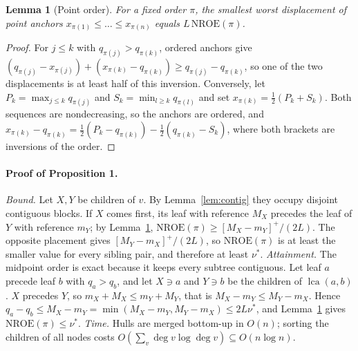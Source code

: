 \documentclass[preprint]{vgtc}
\newtheorem{lemma}{Lemma}
\newcommand{\lca}{\operatorname{lca}}
\newcommand{\nroe}{\mathrm{NROE}}
\begin{document}
\begin{lemma}[Point order]\label{lem:nroe}
For a fixed order $\pi$, the smallest worst displacement of point anchors $x_{\pi(1)}\le\dots\le x_{\pi(n)}$ equals $L\,\nroe(\pi)$.
\end{lemma}
\begin{proof}
For $j\le k$ with $q_{\pi(j)}>q_{\pi(k)}$, ordered anchors give $(q_{\pi(j)}-x_{\pi(j)})+(x_{\pi(k)}-q_{\pi(k)})\ge q_{\pi(j)}-q_{\pi(k)}$, so one of the two displacements is at least half of this inversion. Conversely, let $P_k=\max_{j\le k}q_{\pi(j)}$ and $S_k=\min_{l\ge k}q_{\pi(l)}$ and set $x_{\pi(k)}=\tfrac12(P_k+S_k)$. Both sequences are nondecreasing, so the anchors are ordered, and $x_{\pi(k)}-q_{\pi(k)}=\tfrac12(P_k-q_{\pi(k)})-\tfrac12(q_{\pi(k)}-S_k)$, where both brackets are inversions of the order.
\end{proof}

\paragraph{Proof of Proposition 1.} \emph{Bound.} Let $X,Y$ be children of $v$. By Lemma~\ref{lem:contig} they occupy disjoint contiguous blocks. If $X$ comes first, its leaf with reference $M_X$ precedes the leaf of $Y$ with reference $m_Y$; by Lemma~\ref{lem:nroe}, $\nroe(\pi)\ge[M_X-m_Y]^+/(2L)$. The opposite placement gives $[M_Y-m_X]^+/(2L)$, so $\nroe(\pi)$ is at least the smaller value for every sibling pair, and therefore at least $\nu^*$.
\emph{Attainment.} The midpoint order is exact because it keeps every subtree contiguous. Let leaf $a$ precede leaf $b$ with $q_a>q_b$, and let $X\ni a$ and $Y\ni b$ be the children of $\lca(a,b)$. $X$ precedes $Y$, so $m_X+M_X\le m_Y+M_Y$, that is $M_X-m_Y\le M_Y-m_X$. Hence $q_a-q_b\le M_X-m_Y=\min(M_X-m_Y,M_Y-m_X)\le2L\nu^*$, and Lemma~\ref{lem:nroe} gives $\nroe(\pi)\le\nu^*$.
\emph{Time.} Hulls are merged bottom-up in $O(n)$; sorting the children of all nodes costs $O(\sum_v\deg v\log\deg v)\subseteq O(n\log n)$.
\end{document}
